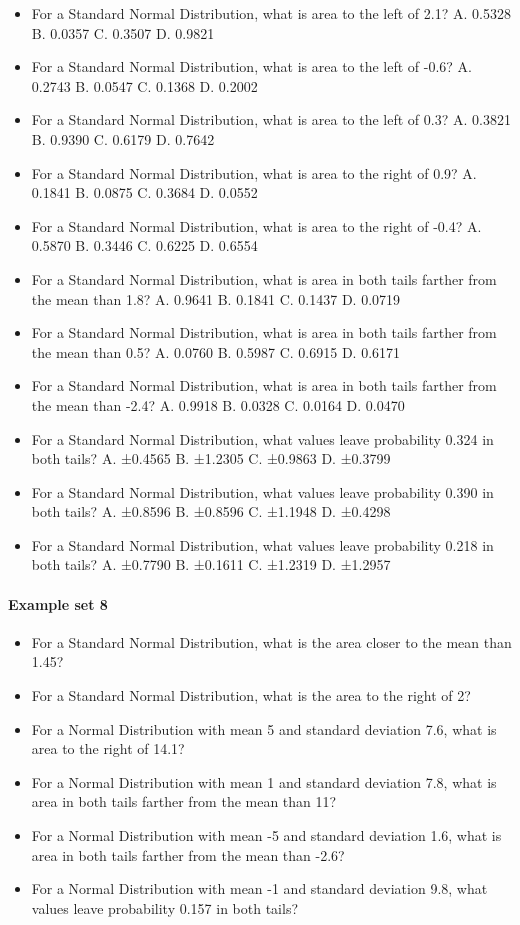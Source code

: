 \documentclass[]{article}
\providecommand{\tightlist}{%
  \setlength{\itemsep}{0pt}\setlength{\parskip}{0pt}}
\let\oldparagraph\paragraph
\renewcommand{\paragraph}[1]{\oldparagraph{#1}\mbox{}}
\begin{document}
\begin{itemize}
\tightlist
\item
  For a Standard Normal Distribution, what is area to the left of 2.1?
  A. 0.5328 B. 0.0357 C. 0.3507 D. 0.9821
\item
  For a Standard Normal Distribution, what is area to the left of -0.6?
  A. 0.2743 B. 0.0547 C. 0.1368 D. 0.2002
\item
  For a Standard Normal Distribution, what is area to the left of 0.3?
  A. 0.3821 B. 0.9390 C. 0.6179 D. 0.7642
\item
  For a Standard Normal Distribution, what is area to the right of 0.9?
  A. 0.1841 B. 0.0875 C. 0.3684 D. 0.0552
\item
  For a Standard Normal Distribution, what is area to the right of -0.4?
  A. 0.5870 B. 0.3446 C. 0.6225 D. 0.6554
\item
  For a Standard Normal Distribution, what is area in both tails farther
  from the mean than 1.8? A. 0.9641 B. 0.1841 C. 0.1437 D. 0.0719
\item
  For a Standard Normal Distribution, what is area in both tails farther
  from the mean than 0.5? A. 0.0760 B. 0.5987 C. 0.6915 D. 0.6171
\item
  For a Standard Normal Distribution, what is area in both tails farther
  from the mean than -2.4? A. 0.9918 B. 0.0328 C. 0.0164 D. 0.0470
\item
  For a Standard Normal Distribution, what values leave probability
  0.324 in both tails? A. ±0.4565 B. ±1.2305 C. ±0.9863 D. ±0.3799
\item
  For a Standard Normal Distribution, what values leave probability
  0.390 in both tails? A. ±0.8596 B. ±0.8596 C. ±1.1948 D. ±0.4298
\item
  For a Standard Normal Distribution, what values leave probability
  0.218 in both tails? A. ±0.7790 B. ±0.1611 C. ±1.2319 D. ±1.2957
\end{itemize}

\paragraph{Example set 8}\label{example-set-8}

\begin{itemize}
\tightlist
\item
  For a Standard Normal Distribution, what is the area closer to the
  mean than 1.45?
\item
  For a Standard Normal Distribution, what is the area to the right of
  2?
\item
  For a Normal Distribution with mean 5 and standard deviation 7.6, what
  is area to the right of 14.1?
\item
  For a Normal Distribution with mean 1 and standard deviation 7.8, what
  is area in both tails farther from the mean than 11?
\item
  For a Normal Distribution with mean -5 and standard deviation 1.6,
  what is area in both tails farther from the mean than -2.6?
\item
  For a Normal Distribution with mean -1 and standard deviation 9.8,
  what values leave probability 0.157 in both tails?
\end{itemize}
\end{document}
